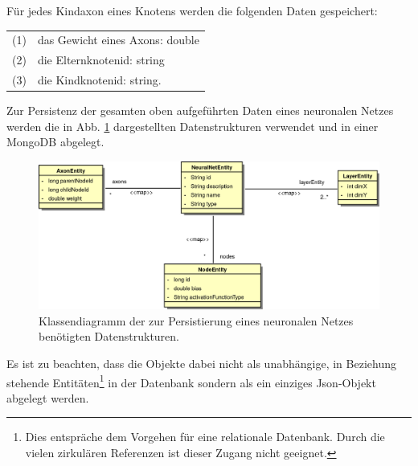 Für jedes Kindaxon eines Knotens werden die folgenden Daten gespeichert: 

\begin{tabular}{cl}
(1) & das Gewicht eines Axons: double \\[0.2cm]
(2) & die Elternknotenid: string \\[0.2cm]
(3) & die Kindknotenid: string. \\[0.2cm]
\end{tabular}

Zur Persistenz der gesamten oben aufgeführten Daten eines neuronalen Netzes werden die in Abb. \ref{fig_dbClassdiagram} dargestellten Datenstrukturen verwendet und in einer MongoDB abgelegt. 
\begin{figure}[h]
\begin{center}
\includegraphics[width=\textwidth]{Abbildungen/UML/jan/datenBankKlassendiagramm.png}
\caption{Klassendiagramm der zur Persistierung eines neuronalen Netzes benötigten Datenstrukturen.}
\label{fig_dbClassdiagram}
\end{center}
\end{figure}
Es ist zu beachten, dass die Objekte dabei nicht als unabhängige, in Beziehung stehende Entitäten\footnote{Dies entspräche dem Vorgehen für eine relationale Datenbank. Durch die vielen zirkulären Referenzen ist dieser Zugang nicht geeignet.} in der Datenbank sondern als ein einziges Json-Objekt abgelegt werden. 
